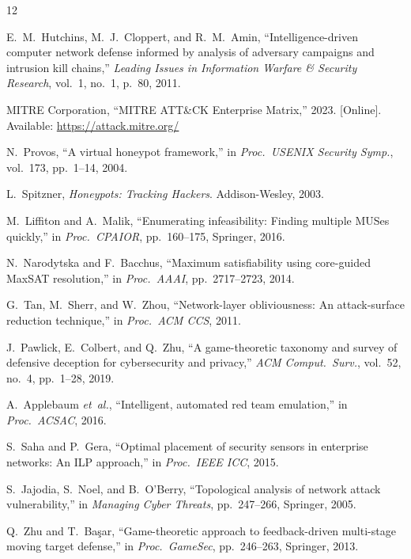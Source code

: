 \documentclass[journal]{IEEEtran}
\newcommand{\etal}{\emph{et~al.}}
\begin{document}
\begin{thebibliography}{12}

E.~M.~Hutchins, M.~J.~Cloppert, and R.~M.~Amin,
``Intelligence-driven computer network defense informed by analysis
of adversary campaigns and intrusion kill chains,''
\textit{Leading Issues in Information Warfare \& Security Research},
vol.~1, no.~1, p.~80, 2011.

MITRE Corporation,
``MITRE ATT\&CK Enterprise Matrix,'' 2023.
[Online]. Available: \url{https://attack.mitre.org/}

N.~Provos,
``A virtual honeypot framework,''
in \textit{Proc.\ USENIX Security Symp.}, vol.~173, pp.~1--14, 2004.

L.~Spitzner,
\textit{Honeypots: Tracking Hackers}.
Addison-Wesley, 2003.

M.~Liffiton and A.~Malik,
``Enumerating infeasibility: Finding multiple MUSes quickly,''
in \textit{Proc.\ CPAIOR}, pp.~160--175, Springer, 2016.

N.~Narodytska and F.~Bacchus,
``Maximum satisfiability using core-guided MaxSAT resolution,''
in \textit{Proc.\ AAAI}, pp.~2717--2723, 2014.

G.~Tan, M.~Sherr, and W.~Zhou,
``Network-layer obliviousness: An attack-surface reduction technique,''
in \textit{Proc.\ ACM CCS}, 2011.

J.~Pawlick, E.~Colbert, and Q.~Zhu,
``A game-theoretic taxonomy and survey of defensive deception for
cybersecurity and privacy,''
\textit{ACM Comput.\ Surv.}, vol.~52, no.~4, pp.~1--28, 2019.

A.~Applebaum \etal,
``Intelligent, automated red team emulation,''
in \textit{Proc.\ ACSAC}, 2016.

S.~Saha and P.~Gera,
``Optimal placement of security sensors in enterprise networks:
An ILP approach,''
in \textit{Proc.\ IEEE ICC}, 2015.

S.~Jajodia, S.~Noel, and B.~O'Berry,
``Topological analysis of network attack vulnerability,''
in \textit{Managing Cyber Threats}, pp.~247--266, Springer, 2005.

Q.~Zhu and T.~Ba\c{s}ar,
``Game-theoretic approach to feedback-driven multi-stage moving
target defense,''
in \textit{Proc.\ GameSec}, pp.~246--263, Springer, 2013.

\end{thebibliography}
\end{document}
